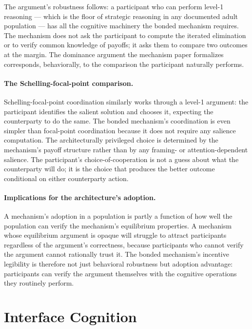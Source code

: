 \documentclass[11pt,a4paper]{article}
\theoremstyle{definition}
\theoremstyle{remark}
\begin{document}
The argument's robustness follows: a participant who can perform
level-1 reasoning --- which is the floor of strategic reasoning in
any documented adult population --- has all the cognitive
machinery the bonded mechanism requires. The mechanism does not
ask the participant to compute the iterated elimination or to
verify common knowledge of payoffs; it asks them to compare
two outcomes at the margin. The dominance argument the mechanism
paper formalizes corresponds, behaviorally, to the comparison
the participant naturally performs.

\paragraph{The Schelling-focal-point comparison.}
Schelling-focal-point coordination
\citep{schelling1960strategy, sugden1995theory} similarly works
through a level-1 argument: the participant identifies the salient
solution and chooses it, expecting the counterparty to do the
same. The bonded mechanism's coordination is even simpler than
focal-point coordination because it does not require any salience
computation. The architecturally privileged choice is determined
by the mechanism's payoff structure rather than by any framing-
or attention-dependent salience. The participant's
choice-of-cooperation is not a guess about what the counterparty
will do; it is the choice that produces the better outcome
conditional on either counterparty action.

\paragraph{Implications for the architecture's adoption.}
A mechanism's adoption in a population is partly a function of
how well the population can verify the mechanism's equilibrium
properties. A mechanism whose equilibrium argument is opaque
will struggle to attract participants regardless of the
argument's correctness, because participants who cannot verify
the argument cannot rationally trust it. The bonded mechanism's
incentive legibility is therefore not just behavioral robustness
but adoption advantage: participants can verify the argument
themselves with the cognitive operations they routinely perform.

\section{Interface Cognition}
\label{sec:interface}
\end{document}
